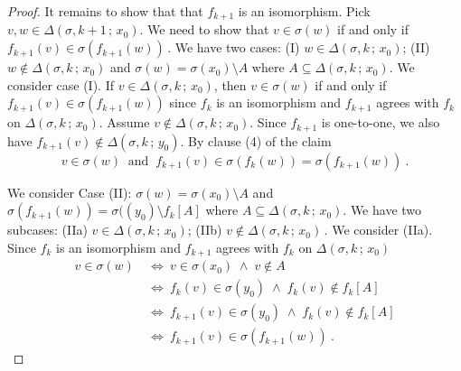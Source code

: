 \documentclass[10pt,a4paper, openany,  oldfontcommands]{memoir}
\newtheorem{open problem} [theorem] {Open Problem}
\begin{document}
\begin{proof}
It remains to show that that  $f_{ k+1}  $  is an isomorphism. 
Pick    $  v, w  \in  \Delta \left(  \sigma , k+1  \,  ;   \,   x_0   \right)   $. 
We need to show that  $  v  \in   \sigma ( w)   $  if and only if  $   f_{ k+1} ( v )   \in     \sigma  \left(   f_{ k+1} ( w )    \right)     \,    $.
We have two cases: 
(I) $   w  \in  \Delta \left(  \sigma , k  \,  ;   \,   x_0   \right)    $; 
(II)   $   w    \not\in  \Delta \left(  \sigma , k  \,  ;   \,   x_0   \right)    $  and 
$  \sigma ( w )  =   \sigma  ( x_0  )   \setminus  A    $
where    $   A    \subseteq    \Delta \left(  \sigma , k  \,  ;   \,   x_0   \right)   $.
We consider case (I). 
If  $  v  \in  \Delta \left(  \sigma , k \,  ;   \,   x_0   \right)   $,  
then   $  v  \in   \sigma ( w)   $  if and only if  $   f_{ k+1} ( v )   \in     \sigma  \left(   f_{ k+1} ( w )    \right)        $
since  $ f_k $  is an isomorphism and  $ f_{ k+1} $  agrees with $  f_k  $  on   $  \Delta \left(  \sigma , k \,  ;   \,   x_0   \right)   $. 
Assume   $  v    \not\in  \Delta \left(  \sigma , k \,  ;   \,   x_0   \right)   $. 
Since  $  f_{ k+1}  $  is one-to-one,   we also have  $  f_{ k+1}  \left(  v  \right)     \not\in  \Delta \left(  \sigma , k \,  ;   \,   y_0   \right)   $. 
By clause (4) of the claim
\[
v  \in   \sigma ( w)     \     \mbox{  and  }        \   
 f_{ k+1} ( v )   \in    \sigma  \left(   f_{ k} ( w )    \right)     =  \sigma  \left(   f_{ k+1} ( w )    \right)      
 \            .
\]








We consider Case (II):   $  \sigma ( w )  =   \sigma  ( x_0  )   \setminus  A    $
and  $  \sigma   \left(   f_{ k+1}    (w )    \right)   =   \sigma  (\left(   y_0    \right)   \setminus   f_k  \left[ A  \right]      $ 
where    $   A    \subseteq    \Delta \left(  \sigma , k  \,  ;   \,   x_0   \right)   $.
We have two subcases: 
(IIa)  $  v  \in    \Delta \left(  \sigma , k \,  ;   \,   x_0   \right)    $; 
(IIb)  $  v  \not\in   \Delta \left(  \sigma , k \,  ;   \,   x_0   \right)       \,    $. 
We consider (IIa). 
Since  $f_k $  is an isomorphism and  $  f_{ k+1}  $  agrees with  $  f_k  $  on   $   \Delta \left(  \sigma , k  \,  ;   \,   x_0   \right)   $
\begin{align*}
 v  \in   \sigma ( w)       \   
 &  \Leftrightarrow     \  
 v   \in  \sigma ( x_0 )     \;   \wedge    \;  v  \not\in  A  
 \\
  &  \Leftrightarrow     \  
 f_k  (v)    \in  \sigma  \left(   y_0  \right)     \;   \wedge    \;    f_k  (v)     \not\in  f_k  \left[  A  \right] 
   \\
  &  \Leftrightarrow     \  
 f_{k+1}  (v)    \in  \sigma  \left(   y_0  \right)     \;   \wedge    \;    f_k  (v)     \not\in  f_k  \left[  A  \right] 
       \\
  &  \Leftrightarrow     \  
   f_{k+1}  (v)     \in    \sigma   \left(    f_{k+1}  (w)    \right)  
   \        .
\end{align*}





\end{proof}
\end{document}
